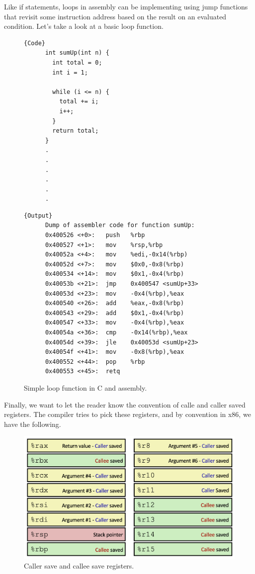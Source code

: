   Like if statements, loops in assembly can be implementing using jump functions that revisit some instruction address based on the result on an evaluated condition. Let's take a look at a basic loop function. 

  \begin{figure}[H]
    \centering 
    \noindent\begin{minipage}{.5\textwidth}
    \begin{lstlisting}[]{Code}
      int sumUp(int n) {
        int total = 0;
        int i = 1;

        while (i <= n) {  
          total += i;   
          i++; 
        }
        return total;
      }
      .
      .
      .
      .
      .
      .
    \end{lstlisting}
    \end{minipage}
    \hfill
    \begin{minipage}{.49\textwidth}
    \begin{lstlisting}[]{Output}
      Dump of assembler code for function sumUp:
      0x400526 <+0>:   push   %rbp
      0x400527 <+1>:   mov    %rsp,%rbp
      0x40052a <+4>:   mov    %edi,-0x14(%rbp)
      0x40052d <+7>:   mov    $0x0,-0x8(%rbp)
      0x400534 <+14>:  mov    $0x1,-0x4(%rbp)
      0x40053b <+21>:  jmp    0x400547 <sumUp+33>
      0x40053d <+23>:  mov    -0x4(%rbp),%eax
      0x400540 <+26>:  add    %eax,-0x8(%rbp)
      0x400543 <+29>:  add    $0x1,-0x4(%rbp)
      0x400547 <+33>:  mov    -0x4(%rbp),%eax
      0x40054a <+36>:  cmp    -0x14(%rbp),%eax
      0x40054d <+39>:  jle    0x40053d <sumUp+23>
      0x40054f <+41>:  mov    -0x8(%rbp),%eax
      0x400552 <+44>:  pop    %rbp
      0x400553 <+45>:  retq
    \end{lstlisting}
    \end{minipage}
    \caption{Simple loop function in C and assembly. } 
    \label{fig:loop_function}
  \end{figure}

  Finally, we want to let the reader know the convention of calle and caller saved registers. The compiler tries to pick these registers, and by convention in x86, we have the following. 

  \begin{figure}[H]
    \centering 
    \includegraphics[scale=0.4]{img/caller_callee_save.png}
    \caption{Caller save and callee save registers. } 
    \label{fig:caller_callee_save}
  \end{figure}

